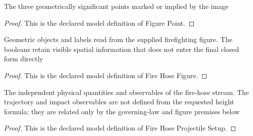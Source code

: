 \begin{definition}
  \label{def:physics:phyx-mini-0683:phyxminiproblems-problemphyxmini0683-figurepoint}
  The three geometrically significant points marked or implied by the image
\end{definition}
\begin{proof}
  This is the declared model definition of Figure Point.
\end{proof}
\begin{definition}
  \label{def:physics:phyx-mini-0683:phyxminiproblems-problemphyxmini0683-firehosefigure}
  Geometric objects and labels read from the supplied firefighting figure. The booleans retain visible spatial information that does not enter the final closed form directly
\end{definition}
\begin{proof}
  This is the declared model definition of Fire Hose Figure.
\end{proof}
\begin{definition}
  \label{def:physics:phyx-mini-0683:phyxminiproblems-problemphyxmini0683-firehoseprojectilesetup}
  The independent physical quantities and observables of the fire-hose stream. The trajectory and impact observables are not defined from the requested height formula; they are related only by the governing-law and figure premises below
\end{definition}
\begin{proof}
  This is the declared model definition of Fire Hose Projectile Setup.
\end{proof}
